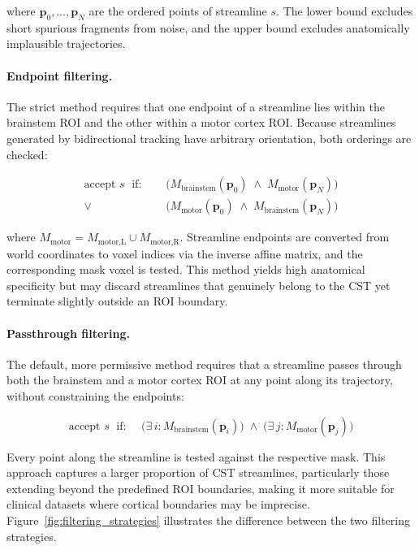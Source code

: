 where $\mathbf{p}_0, \ldots, \mathbf{p}_N$ are the ordered points of streamline $s$. The lower bound excludes short spurious fragments from noise, and the upper bound excludes anatomically implausible trajectories.

\paragraph{Endpoint filtering.}

The strict method requires that one endpoint of a streamline lies within the brainstem ROI and the other within a motor cortex ROI. Because streamlines generated by bidirectional tracking have arbitrary orientation, both orderings are checked:

\begin{equation}
	\begin{aligned}
		\text{accept } s \;\text{ if: } \quad
		& \bigl(M_{\text{brainstem}}(\mathbf{p}_0) \;\wedge\; M_{\text{motor}}(\mathbf{p}_N)\bigr) \\
		\vee\; & \bigl(M_{\text{motor}}(\mathbf{p}_0) \;\wedge\; M_{\text{brainstem}}(\mathbf{p}_N)\bigr)
	\end{aligned}
	\label{eq:endpoint_condition}
\end{equation}

where $M_{\text{motor}} = M_{\text{motor,L}} \cup M_{\text{motor,R}}$. Streamline endpoints are converted from world coordinates to voxel indices via the inverse affine matrix, and the corresponding mask voxel is tested. This method yields high anatomical specificity but may discard streamlines that genuinely belong to the CST yet terminate slightly outside an ROI boundary.

\paragraph{Passthrough filtering.}

The default, more permissive method requires that a streamline passes through both the brainstem and a motor cortex ROI at any point along its trajectory, without constraining the endpoints:

\begin{equation}
	\text{accept } s \;\text{ if: } \quad
	\bigl(\exists\, i : M_{\text{brainstem}}(\mathbf{p}_i)\bigr)
	\;\wedge\;
	\bigl(\exists\, j : M_{\text{motor}}(\mathbf{p}_j)\bigr)
	\label{eq:passthrough_condition}
\end{equation}

Every point along the streamline is tested against the respective mask. This approach captures a larger proportion of CST streamlines, particularly those extending beyond the predefined ROI boundaries, making it more suitable for clinical datasets where cortical boundaries may be imprecise. Figure~\ref{fig:filtering_strategies} illustrates the difference between the two filtering strategies.


